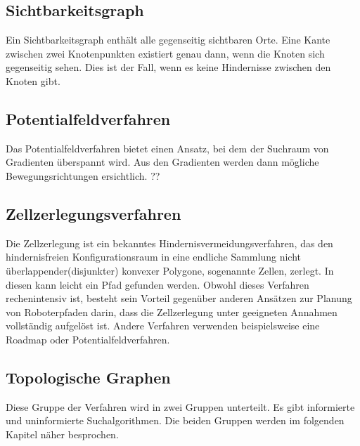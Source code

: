 \subsection{Sichtbarkeitsgraph} 
Ein Sichtbarkeitsgraph enthält alle gegenseitig sichtbaren Orte. Eine Kante zwischen zwei Knotenpunkten existiert genau dann, wenn die Knoten sich gegenseitig sehen. Dies ist der Fall, wenn es keine Hindernisse zwischen den Knoten gibt. \cite{visG1}

\subsection{Potentialfeldverfahren}
Das Potentialfeldverfahren bietet einen Ansatz, bei dem der Suchraum von Gradienten überspannt wird. Aus den Gradienten werden dann mögliche Bewegungsrichtungen ersichtlich. ?? \cite{potField}

\subsection{Zellzerlegungsverfahren}

Die Zellzerlegung ist ein bekanntes Hindernisvermeidungsverfahren, das den hindernisfreien Konfigurationsraum in eine endliche Sammlung nicht überlappender(disjunkter) konvexer Polygone, sogenannte Zellen, zerlegt. In diesen kann leicht ein Pfad gefunden werden. Obwohl dieses Verfahren rechenintensiv ist, besteht sein Vorteil gegenüber anderen Ansätzen zur Planung von Roboterpfaden darin, dass die Zellzerlegung unter geeigneten Annahmen vollständig aufgelöst ist. Andere Verfahren verwenden beispielsweise eine Roadmap oder Potentialfeldverfahren.\cite{cd}

\subsection{Topologische Graphen}
Diese Gruppe der Verfahren wird in zwei Gruppen unterteilt. Es gibt informierte und uninformierte Suchalgorithmen. Die beiden Gruppen werden im folgenden Kapitel näher besprochen.
